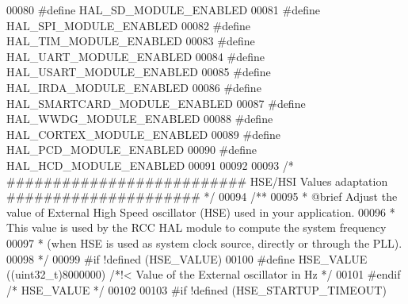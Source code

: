 \begin{DoxyCode}
00080 \textcolor{preprocessor}{#}\textcolor{preprocessor}{define} \textcolor{preprocessor}{HAL\_SD\_MODULE\_ENABLED}
00081 \textcolor{preprocessor}{#}\textcolor{preprocessor}{define} \textcolor{preprocessor}{HAL\_SPI\_MODULE\_ENABLED}
00082 \textcolor{preprocessor}{#}\textcolor{preprocessor}{define} \textcolor{preprocessor}{HAL\_TIM\_MODULE\_ENABLED}
00083 \textcolor{preprocessor}{#}\textcolor{preprocessor}{define} \textcolor{preprocessor}{HAL\_UART\_MODULE\_ENABLED}
00084 \textcolor{preprocessor}{#}\textcolor{preprocessor}{define} \textcolor{preprocessor}{HAL\_USART\_MODULE\_ENABLED}
00085 \textcolor{preprocessor}{#}\textcolor{preprocessor}{define} \textcolor{preprocessor}{HAL\_IRDA\_MODULE\_ENABLED}
00086 \textcolor{preprocessor}{#}\textcolor{preprocessor}{define} \textcolor{preprocessor}{HAL\_SMARTCARD\_MODULE\_ENABLED}
00087 \textcolor{preprocessor}{#}\textcolor{preprocessor}{define} \textcolor{preprocessor}{HAL\_WWDG\_MODULE\_ENABLED}
00088 \textcolor{preprocessor}{#}\textcolor{preprocessor}{define} \textcolor{preprocessor}{HAL\_CORTEX\_MODULE\_ENABLED}
00089 \textcolor{preprocessor}{#}\textcolor{preprocessor}{define} \textcolor{preprocessor}{HAL\_PCD\_MODULE\_ENABLED}
00090 \textcolor{preprocessor}{#}\textcolor{preprocessor}{define} \textcolor{preprocessor}{HAL\_HCD\_MODULE\_ENABLED}
00091 
00092 
00093 \textcolor{comment}{/* ########################## HSE/HSI Values adaptation ##################### */}
00094 \textcolor{comment}{/**}
00095 \textcolor{comment}{  * @brief Adjust the value of External High Speed oscillator (HSE) used in your application.}
00096 \textcolor{comment}{  *        This value is used by the RCC HAL module to compute the system frequency}
00097 \textcolor{comment}{  *        (when HSE is used as system clock source, directly or through the PLL).  }
00098 \textcolor{comment}{  */}
00099 \textcolor{preprocessor}{#}\textcolor{preprocessor}{if} \textcolor{preprocessor}{!}\textcolor{preprocessor}{defined}  \textcolor{preprocessor}{(}HSE_VALUE\textcolor{preprocessor}{)}
00100   \textcolor{preprocessor}{#}\textcolor{preprocessor}{define} \textcolor{preprocessor}{HSE\_VALUE}    \textcolor{preprocessor}{(}\textcolor{preprocessor}{(}\textcolor{preprocessor}{uint32\_t}\textcolor{preprocessor}{)}8000000\textcolor{preprocessor}{)} \textcolor{comment}{/*!< Value of the External oscillator in Hz */}
00101 \textcolor{preprocessor}{#}\textcolor{preprocessor}{endif} \textcolor{comment}{/* HSE\_VALUE */}
00102 
00103 \textcolor{preprocessor}{#}\textcolor{preprocessor}{if} \textcolor{preprocessor}{!}\textcolor{preprocessor}{defined}  \textcolor{preprocessor}{(}HSE_STARTUP_TIMEOUT\textcolor{preprocessor}{)}

\end{DoxyCode}
